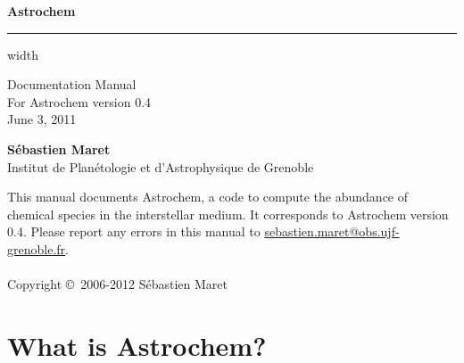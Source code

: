\documentclass[a4paper,12pt]{article}
\makeatletter
\newcommand{\version}{0.4}
\newcommand{\updated}{June 3, 2011}
\newcommand{\bugreport}{\url{sebastien.maret@obs.ujf-grenoble.fr}}
\makeatother
\begin{document}
\VerbatimFootnotes

\thispagestyle{empty}
\vspace*{5cm}

\noindent
{\huge \textbf{Astrochem}}

\vskip4pt \hrule height 4pt width \hsize

\begin{flushright}
  \noindent
  { \small
    Documentation Manual\\
    For Astrochem version \version\\
    \updated
  }
\end{flushright}

\noindent
{\large \textbf{S\'ebastien Maret}}\\
{\small Institut de Plan\'etologie et d'Astrophysique de Grenoble\\}

\newpage
\vspace*{20cm}

{\small
  \noindent This manual documents Astrochem, a code to compute the
  abundance of chemical species in the interstellar medium. It
  corresponds to Astrochem version \version.
  Please report any errors in this manual to \bugreport.
  \\ \\ \noindent Copyright \copyright \, 2006-2012 S\'ebastien
  Maret
}

\section{What is Astrochem?}
\label{sec:what-astrochem}
\end{document}
